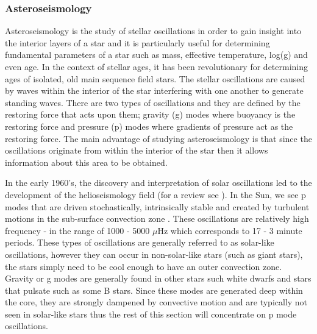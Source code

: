\subsubsection{Asteroseismology}
Asteroseismology is the study of stellar oscillations in order to gain insight into the interior layers of a star and it is particularly useful for determining fundamental parameters of a star such as mass, effective temperature, log(g) and even age. In the context of stellar ages, it has been revolutionary for determining ages of isolated, old main sequence field stars. The stellar oscillations are caused by waves within the interior of the star interfering with one another to generate standing waves. There are two types of oscillations and they are defined by the restoring force that acts upon them; gravity (g) modes where buoyancy is the restoring force and pressure (p) modes where gradients of pressure act as the restoring force. The main advantage of studying asteroseismology is that since the oscillations originate from within the interior of the star then it allows information about this area to be obtained.

In the early 1960's, the discovery and interpretation of solar oscillations led to the development of the helioseismology field (for a review see \citealt{Christensen-Dalsgaard_2002}). In the Sun, we see p modes that are  driven stochastically, intrinsically stable and created by turbulent motions in the sub-surface convection zone \citep{Samadi_Goupil_2001}. These oscillations are relatively high frequency - in the range of 1000 - 5000 $\mu$Hz which corresponds to 17 - 3 minute periods. These types of oscillations are generally referred to as solar-like oscillations, however they can occur in non-solar-like stars (such as giant stars), the stars simply need to be cool enough to have an outer convection zone. Gravity or g modes are generally found in other stars such white dwarfs and stars that pulsate such as some B stars. Since these modes are generated deep within the core, they are strongly dampened by convective motion and are typically not seen in solar-like stars thus the rest of this section will concentrate on p mode oscillations.

